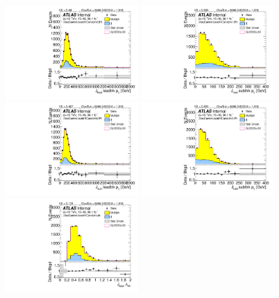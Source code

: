\begin{figure}[htbp!]
\begin{center}
\includegraphics[width=0.45\textwidth,angle=-90]{figures/boosted/Control/b77_TwoTag_split_Control_leadHCand_trk0_Pt.pdf}
\includegraphics[width=0.45\textwidth,angle=-90]{figures/boosted/Control/b77_TwoTag_split_Control_leadHCand_trk1_Pt.pdf}\\
\includegraphics[width=0.45\textwidth,angle=-90]{figures/boosted/Control/b77_TwoTag_split_Control_sublHCand_trk0_Pt.pdf}
\includegraphics[width=0.45\textwidth,angle=-90]{figures/boosted/Control/b77_TwoTag_split_Control_sublHCand_trk1_Pt.pdf}\\
\includegraphics[width=0.45\textwidth,angle=-90]{figures/boosted/Control/b77_TwoTag_split_Control_leadHCand_trk_dr.pdf}

\end{center}
\end{figure}
